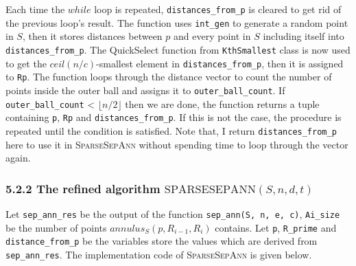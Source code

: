 \documentclass[12pt,english,]{article}
\newcommand{\code}[1]{\colorbox{lbcolor}{\texttt{#1}}}
\newcommand{\pnt}[1]{{\scriptstyle#1}}
\begin{document}
Each time the \(while\) loop is repeated, \code{distances\_from\_p} is
cleared to get rid of the previous loop's result. The function uses
\code{int\_gen} to generate a random point in \(S\), then it stores
distances between \(p\) and every point in \(S\) including itself into
\code{distances\_from\_p}. The QuickSelect function from
\code{KthSmallest} class is now used to get the \(ceil(n/c)\)-smallest
element in \code{distances\_from\_p}, then it is assigned to \code{Rp}.
The function loops through the distance vector to count the number of
points inside the outer ball and assigns it to
\code{outer\_ball\_count}. If \code{outer\_ball\_count} \textless{}
\(\lfloor n/2 \rfloor\) then we are done, the function returns a tuple
containing \code{p}, \code{Rp} and \code{distances\_from\_p}. If this is
not the case, the procedure is repeated until the condition is
satisfied. Note that, I return \code{distances\_from\_p} here to use it
in \textsc{SparseSepAnn} without spending time to loop through the
vector again.

\hypertarget{section5.2.2}{%
\subsubsection{\texorpdfstring{5.2.2 The refined algorithm
\(\mathrm{S\pnt{PARSE}S\pnt{EP}A\pnt{NN}}(S,n,d,t)\)}{5.2.2 The refined algorithm \textbackslash{}mathrm\{S\textbackslash{}pnt\{PARSE\}S\textbackslash{}pnt\{EP\}A\textbackslash{}pnt\{NN\}\}(S,n,d,t)}}\label{section5.2.2}}

Let \code{sep\_ann\_res} be the output of the function
\code{sep\_ann(S, n, e, c)}, \code{Ai\_size} be the number of points
\(annulus_S(p, R_{i-1}, R_i)\) contains. Let \code{p}, \code{R\_prime}
and \code{distance\_from\_p} be the variables store the values which are
derived from \code{sep\_ann\_res}. The implementation code of
\textsc{SparseSepAnn} is given below.

~
\end{document}
